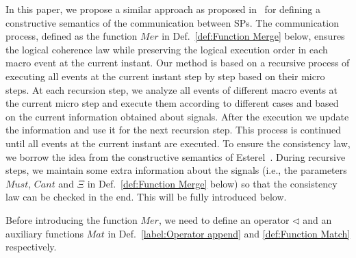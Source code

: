 \documentclass{fcs}
\newcommand{\Must}[0]{\mathit{Must}}
\newcommand{\Cannot}[0]{\mathit{Cant}}
\newcommand{\Chk}[0]{\mathit{Chk}}
\newcommand{\Match}[0]{\mathit{Mat}}
\newcommand{\Merge}[0]{\mathit{Mer}}
\newcommand{\append}[0]{\triangleleft}
\newcommand{\SV}[0]{\Xi}
\begin{document}
In this paper, we propose a similar approach as proposed in~\cite{Berry99} for defining a constructive semantics of the communication between SPs.
The communication process, defined as the function $\Merge$ in Def.~\ref{def:Function Merge} below, ensures the logical coherence law while preserving the logical execution order in each macro event at the current instant.
Our method is based on a recursive process of executing all events at the current instant step by step based on their micro steps.
At each recursion step, we analyze all events of different macro events at the current micro step and execute them according to different cases and based on the current information obtained about signals.
After the execution we update the information and use it for the next recursion step.
This process is continued until all events at the current instant are executed.
\ifx
To ensure the consistency law, we borrow the idea from the constructive semantics of Esterel~\cite{EsterelConstructiveBook}.
During recursive steps, we maintain some extra information about the signals (i.e., the parameters $\Must$, $\Cannot$ and $\SV$ in Def.~\ref{def:Function Merge} below)
so that the consistency law can be checked in the end. This will be fully introduced below.
\fi

\ifx
Before introducing the function $\Merge$, we need to define an operator $\append$ and an auxiliary functions $\Match$ in Def.~\ref{label:Operator append} and \ref{def:Function Match} respectively.
\end{document}
